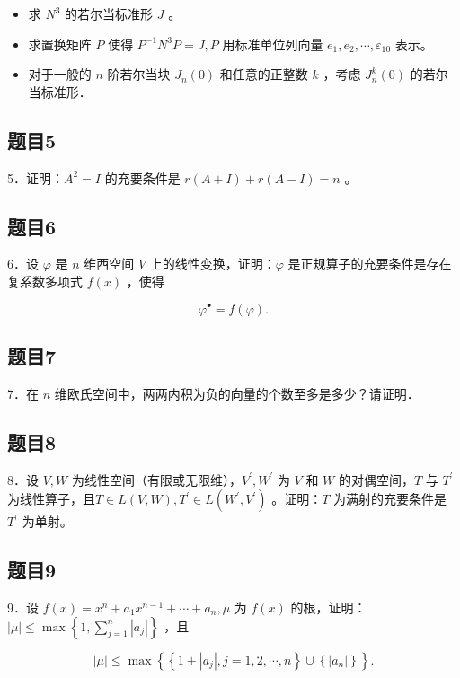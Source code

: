 \documentclass{article}
\begin{document}
\begin{itemize}
  \item[（1）] 求 \(N^{3}\) 的若尔当标准形 \(J\) 。
  \item[（2）] 求置换矩阵 \(P\) 使得 \(P^{-1} N^{3} P=J, P\) 用标准单位列向量 \(e_{1}, e_{2}, \cdots, \varepsilon_{10}\) 表示。
  \item[（3）] 对于一般的 \(n\) 阶若尔当块 \(J_{n}(0)\) 和任意的正整数 \(k\) ，考虑 \(J_{n}^{k}(0)\) 的若尔当标准形．
\end{itemize}

\subsection{题目5}
5．证明：\(A^{2}=I\) 的充要条件是 \(r(A+I)+r(A-I)=n\) 。

\subsection{题目6}
6．设 \(\varphi\) 是 \(n\) 维西空间 \(V\) 上的线性变换，证明：\(\varphi\) 是正规算子的充要条件是存在复系数多项式 \(f(x)\) ，使得

\[
\varphi^{\bullet}=f(\varphi) .
\]

\subsection{题目7}
7．在 \(n\) 维欧氏空间中，两两内积为负的向量的个数至多是多少？请证明．

\subsection{题目8}
8．设 \(V, W\) 为线性空间（有限或无限维），\(V^{\prime}, W^{\prime}\) 为 \(V\) 和 \(W\) 的对偶空间，\(T\) 与 \(T^{\prime}\) 为线性算子，且\(T \in L(V, W), T^{\prime} \in L\left(W^{\prime}, V^{\prime}\right)\) 。证明：\(T\) 为满射的充要条件是 \(T^{\prime}\) 为单射。

\subsection{题目9}
9．设 \(f(x)=x^{n}+a_{1} x^{n-1}+\cdots+a_{n}, \mu\) 为 \(f(x)\) 的根，证明：\(|\mu| \leq \max \left\{1, \sum_{j=1}^{n}\left|a_{j}\right|\right\}\) ，且

\[
|\mu| \leq \max \left\{\left\{1+\left|a_{j}\right|, j=1,2, \cdots, n\right\} \cup\left\{\left|a_{n}\right|\right\}\right\} .
\]
\end{document}
